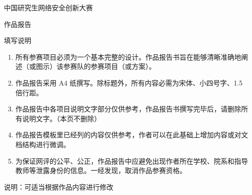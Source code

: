 \documentclass[UTF8,a4paper,zihao=-4,fontset=windows,openany]{ctexbook}
\begin{document}
\raggedbottom
\songti{}

\newcommand{\ReportWorkName}{}
\newcommand{\ReportSubmitDate}{}

\thispagestyle{empty}
\vspace*{41mm}
\begin{center}
  {\heiti{}
    中国研究生网络安全创新大赛\par
    \vspace{4mm}
    作品报告\par
  }
\end{center}

\vspace{48mm}
\noindent
{}%
\underline{\makebox[110mm][c]{\heiti\zihao{3}\ReportWorkName}}\par
\vspace{13mm}
\noindent
{}%
\underline{\makebox[110mm][c]{\heiti\zihao{3}\ReportSubmitDate}}\par
\clearpage
\thispagestyle{empty}
\begin{center}
  {\heiti{}填写说明\par}
\end{center}
\vspace{7mm}

\begin{enumerate}
  \item 所有参赛项目必须为一个基本完整的设计。作品报告书旨在能够清晰准确地阐述（或图示）该参赛队的参赛项目（或方案）。
  \item 作品报告采用 A4 纸撰写。除标题外，所有内容必需为宋体、小四号字、1.5 倍行距。
  \item 作品报告中各项目说明文字部分仅供参考，作品报告书撰写完毕后，请删除所有说明文字。（本页不删除）
  \item 作品报告模板里已经列的内容仅供参考，作者可以在此基础上增加内容或对文档结构进行微调。
  \item 为保证网评的公平、公正，作品报告中应避免出现作者所在学校、院系和指导教师等泄露身份的信息。一经发现，取消作品参赛资格。
\end{enumerate}
\clearpage
\tableofcontents
\thispagestyle{empty}
\vspace{18mm}
\noindent\songti{}说明：可适当根据作品内容进行修改
\clearpage
{}
\pagestyle{plain}
\end{document}
